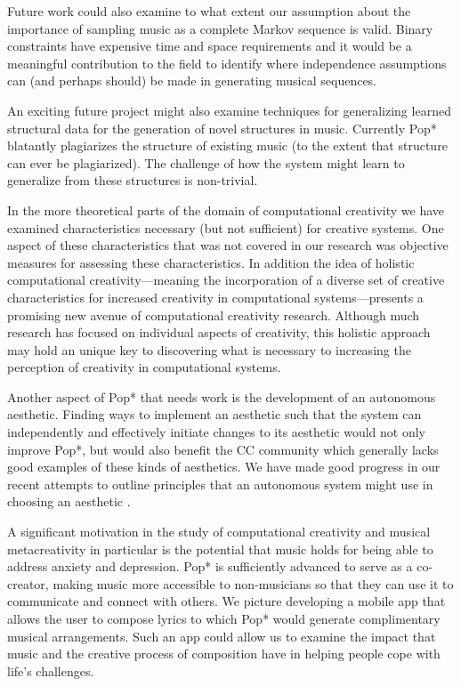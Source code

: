 \documentclass[phd,electronic,oneside,twosidetoc,letterpaper,chaptercenter,parttop,lof,lot]{byumsphd}
\begin{document}
Future work could also examine to what extent our assumption about the importance of sampling music as a complete Markov sequence is valid. Binary constraints have expensive time and space requirements and it would be a meaningful contribution to the field to identify where independence assumptions can (and perhaps should) be made in generating musical sequences.

An exciting future project might also examine techniques for generalizing learned structural data for the generation of novel structures in music. Currently Pop* blatantly plagiarizes the structure of existing music (to the extent that structure can ever be plagiarized). The challenge of how the system might learn to generalize from these structures is non-trivial.

In the more theoretical parts of the domain of computational creativity we have examined characteristics necessary (but not sufficient) for creative systems. One aspect of these characteristics that was not covered in our research was objective measures for assessing these characteristics. In addition the idea of holistic computational creativity---meaning the incorporation of a diverse set of creative characteristics for increased creativity in computational systems---presents a promising new avenue of computational creativity research. Although much research has focused on individual aspects of creativity, this holistic approach may hold an unique key to discovering what is necessary to increasing the perception of creativity in computational systems.

Another aspect of Pop* that needs work is the development of an autonomous aesthetic. Finding ways to implement an aesthetic such that the system can independently and effectively initiate changes to its aesthetic would not only improve Pop*, but would also benefit the CC community which generally lacks good examples of these kinds of aesthetics. We have made good progress in our recent attempts to outline principles that an autonomous system might use in choosing an aesthetic \cite{Bodily2018ExplainabilitySystems}.

A significant motivation in the study of computational creativity and musical metacreativity in particular is the potential that music holds for being able to address anxiety and depression. Pop* is sufficiently advanced to serve as a co-creator, making music more accessible to non-musicians so that they can use it to communicate and connect with others. We picture developing a mobile app that allows the user to compose lyrics to which Pop* would generate complimentary musical arrangements. Such an app could allow us to examine the impact that music and the creative process of composition have in helping people cope with life's challenges.
\end{document}
